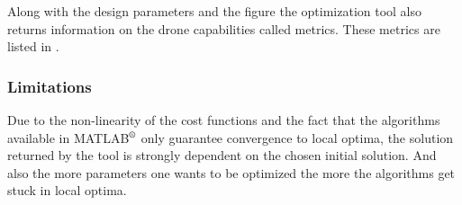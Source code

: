 Along with the design parameters and the figure the optimization tool also
returns information on the drone capabilities called metrics. These metrics are
listed in .

\begin{table}[!h]
\begin{center}
 \caption{List of the metrics returned by the optimization tool.}\vspace{1ex}
 \label{tab:tab_metrics}
\end{center}
\end{table}

\subsubsection{Limitations}
\label{sec:limitations}
Due to the non-linearity of the cost functions and the fact that the algorithms
available in MATLAB$^\textrm{\textregistered}$ only guarantee convergence
to local optima, the solution returned by the tool is strongly dependent on the
chosen initial solution. And also the more parameters one wants to be optimized the
more the algorithms get stuck in local optima.

